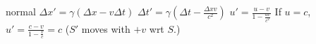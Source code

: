 \begin{solution}{normal}
$\Delta x'=\gamma(\Delta x-v\Delta t)$
$\Delta t'=\gamma(\Delta t - \frac{\Delta x v}{c^2})$
$u'=\frac{u-v}{1-\frac{uv}{c^2}}$
If $u=c$,
$u'=\frac{c-v}{1-\frac{v}{c}}=c$
($S'$ moves with $+v$ wrt $S$.)
\end{solution}